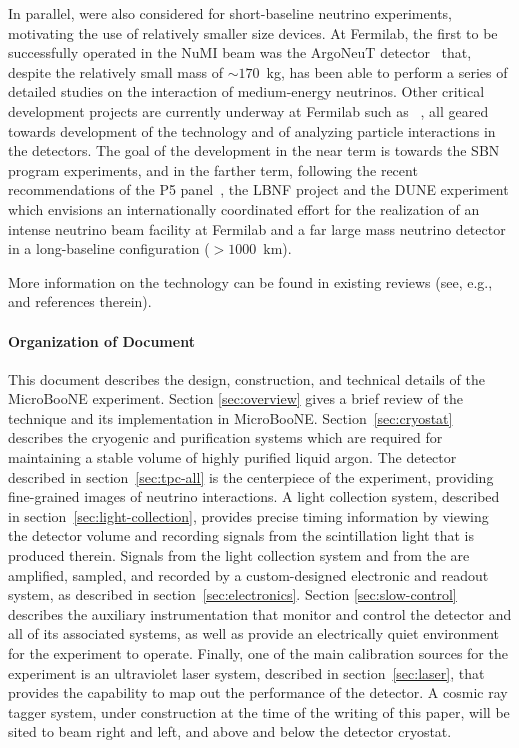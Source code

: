 In parallel, \lartpcs were also considered for short-baseline neutrino experiments, motivating the use of relatively smaller size devices.  At Fermilab, the first \lartpc to be successfully operated in the NuMI beam was the ArgoNeuT detector~\cite{Anderson:2012-argoneut,Acciarri:2013-argoneut-recomb,Anderson:2012-argoneut-CCincl,Acciarri:2014-argoneut-CCxsec,Acciarri:2014-argoneut-CCcohpi} that, despite the relatively small mass of $\sim170$~kg, has been able to perform a series of detailed studies on the interaction of medium-energy neutrinos\cite{argoneutpapers}.  Other critical development projects are currently underway at Fermilab such as ~\cite{Cavanna:2014-lariat,Szelc:2013-lariatlight,Adamowski:2014-LAPD,Rebel:2011-MTS,Montanari:2013-35ton}, all geared towards development of the technology and of analyzing particle interactions in the detectors.   The goal of the development in the near term is towards the SBN program experiments, and in the farther term, following the recent recommendations of the P5 panel~\cite{P5:2014}, the LBNF project and the DUNE experiment which envisions an internationally coordinated effort for the realization of an intense neutrino beam facility at Fermilab and a far large mass neutrino detector in a long-baseline configuration ($>1000$~km). 

More information on the \lartpc technology can be found in existing reviews (see, e.g.,~\cite{Marchionni:2013} and references therein).
 
 \paragraph{Organization of Document}

This document describes the design, construction, and technical details of the MicroBooNE experiment.  Section \ref{sec:overview} gives a brief review of the \lartpc technique and its implementation in MicroBooNE.  Section~\ref{sec:cryostat} describes the cryogenic and purification systems which are required for maintaining a stable volume of highly purified liquid argon.  The \lartpc detector described in section~\ref{sec:tpc-all} is the centerpiece of the experiment, providing fine-grained images of neutrino interactions.  A light collection system, described in section~\ref{sec:light-collection}, provides precise timing information by viewing the detector volume and recording signals from the scintillation light that is produced therein. Signals from the light collection system and from the \lartpc are amplified, sampled, and recorded by a custom-designed electronic and readout system, as described in section~\ref{sec:electronics}.  Section \ref{sec:slow-control} describes the auxiliary instrumentation that monitor and control the detector and all of its associated systems, as well as provide an electrically quiet environment for the experiment to operate. Finally, one of the main calibration sources for the experiment is an ultraviolet laser system, described in section~\ref{sec:laser}, that provides the capability to map out the performance of the \lartpc detector.  A cosmic ray tagger system, under construction at the time of the writing of this paper, will be sited to beam right and left, and above and below the detector cryostat.

